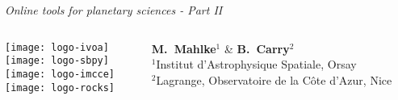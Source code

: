 \begin{frame}

  \begin{center}

    \emph{\Large Online tools for planetary sciences - Part II}\\

    \vspace{2em}
    \begin{columns}[T]
      \begin{column}{.3\textwidth}
        \vspace{0.5em}\texttt{[image: logo-ivoa]}\\
        \vspace{0.5em}\texttt{[image: logo-sbpy]}\\
        \vspace{0.5em}\texttt{[image: logo-imcce]}\\
        \vspace{0.5em}\texttt{[image: logo-rocks]}
      \end{column}
      \begin{column}{.7\textwidth}
        \small
        \vspace{3cm}
        \textbf{M.~Mahlke}$^1$ \& \textbf{B.~Carry}$^2$\\

        \footnotesize{$^1$Institut d'Astrophysique Spatiale, Orsay}\\
        \footnotesize{$^2$Lagrange, Observatoire de la C{\^o}te d'Azur, Nice}
      \end{column}
    \end{columns}

  \end{center}

\end{frame}
